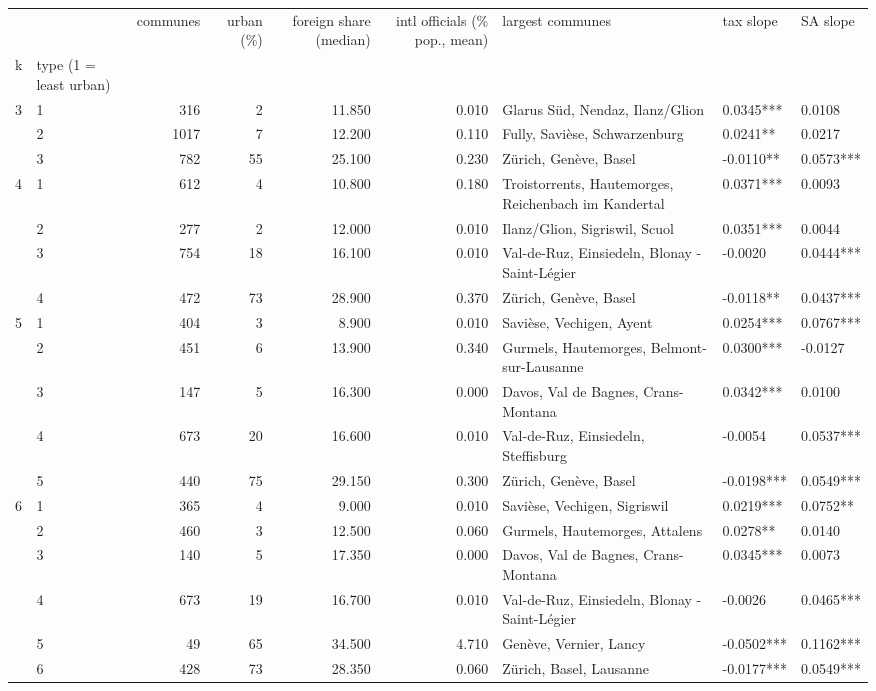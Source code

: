 \begin{tabular}{llrrrrlll}
\toprule
 &  & communes & urban (\%) & foreign share (median) & intl officials (\% pop., mean) & largest communes & tax slope & SA slope \\
k & type (1 = least urban) &  &  &  &  &  &  &  \\
\midrule
\multirow[t]{3}{*}{3} & 1 & 316 & 2 & 11.850 & 0.010 & Glarus Süd, Nendaz, Ilanz/Glion & 0.0345*** & 0.0108 \\
 & 2 & 1017 & 7 & 12.200 & 0.110 & Fully, Savièse, Schwarzenburg & 0.0241** & 0.0217 \\
 & 3 & 782 & 55 & 25.100 & 0.230 & Zürich, Genève, Basel & -0.0110** & 0.0573*** \\
\cline{1-9}
\multirow[t]{4}{*}{4} & 1 & 612 & 4 & 10.800 & 0.180 & Troistorrents, Hautemorges, Reichenbach im Kandertal & 0.0371*** & 0.0093 \\
 & 2 & 277 & 2 & 12.000 & 0.010 & Ilanz/Glion, Sigriswil, Scuol & 0.0351*** & 0.0044 \\
 & 3 & 754 & 18 & 16.100 & 0.010 & Val-de-Ruz, Einsiedeln, Blonay - Saint-Légier & -0.0020 & 0.0444*** \\
 & 4 & 472 & 73 & 28.900 & 0.370 & Zürich, Genève, Basel & -0.0118** & 0.0437*** \\
\cline{1-9}
\multirow[t]{5}{*}{5} & 1 & 404 & 3 & 8.900 & 0.010 & Savièse, Vechigen, Ayent & 0.0254*** & 0.0767*** \\
 & 2 & 451 & 6 & 13.900 & 0.340 & Gurmels, Hautemorges, Belmont-sur-Lausanne & 0.0300*** & -0.0127 \\
 & 3 & 147 & 5 & 16.300 & 0.000 & Davos, Val de Bagnes, Crans-Montana & 0.0342*** & 0.0100 \\
 & 4 & 673 & 20 & 16.600 & 0.010 & Val-de-Ruz, Einsiedeln, Steffisburg & -0.0054 & 0.0537*** \\
 & 5 & 440 & 75 & 29.150 & 0.300 & Zürich, Genève, Basel & -0.0198*** & 0.0549*** \\
\cline{1-9}
\multirow[t]{6}{*}{6} & 1 & 365 & 4 & 9.000 & 0.010 & Savièse, Vechigen, Sigriswil & 0.0219*** & 0.0752** \\
 & 2 & 460 & 3 & 12.500 & 0.060 & Gurmels, Hautemorges, Attalens & 0.0278** & 0.0140 \\
 & 3 & 140 & 5 & 17.350 & 0.000 & Davos, Val de Bagnes, Crans-Montana & 0.0345*** & 0.0073 \\
 & 4 & 673 & 19 & 16.700 & 0.010 & Val-de-Ruz, Einsiedeln, Blonay - Saint-Légier & -0.0026 & 0.0465*** \\
 & 5 & 49 & 65 & 34.500 & 4.710 & Genève, Vernier, Lancy & -0.0502*** & 0.1162*** \\
 & 6 & 428 & 73 & 28.350 & 0.060 & Zürich, Basel, Lausanne & -0.0177*** & 0.0549*** \\
\cline{1-9}
\bottomrule
\end{tabular}

